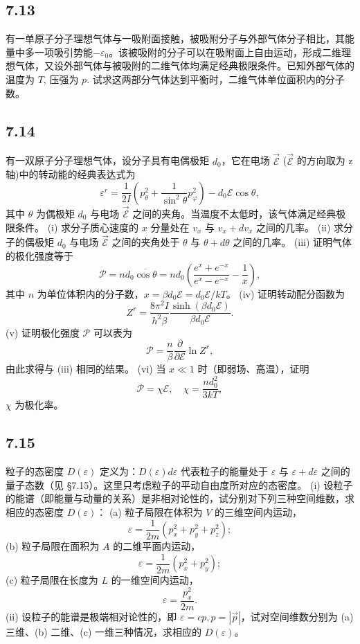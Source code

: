 \newpage
\subsection{7.13}
有一单原子分子理想气体与一吸附面接触，被吸附分子与外部气体分子相比，其能量中多一项吸引势能$-\varepsilon_0$。该被吸附的分子可以在吸附面上自由运动，形成二维理想气体，又设外部气体与被吸附的二维气体均满足经典极限条件。已知外部气体的温度为 $T$, 压强为 $p$. 试求这两部分气体达到平衡时，二维气体单位面积内的分子数。

\newpage
\subsection{7.14}
有一双原子分子理想气体，设分子具有电偶极矩 $d_0$，它在电场 $\vec{\mathcal{E}}$ ($\vec{\mathcal{E}}$ 的方向取为 z 轴)中的转动能的经典表达式为
$$\varepsilon^r = \frac{1}{2I} \left( p_{\theta}^2 + \frac{1}{\sin^2 \theta} p_{\varphi}^2 \right) - d_0 \mathcal{E} \cos \theta,$$
其中 $\theta$ 为偶极矩 $d_0$ 与电场 $\vec{\mathcal{E}}$ 之间的夹角。当温度不太低时，该气体满足经典极限条件。
(i) 求分子质心速度的 $x$ 分量处在 $v_x$ 与 $v_x + dv_x$ 之间的几率。
(ii) 求分子的偶极矩 $d_0$ 与电场 $\vec{\mathcal{E}}$ 之间的夹角处于 $\theta$ 与 $\theta + d\theta$ 之间的几率。
(iii) 证明气体的极化强度等于
$$\mathcal{P} = n d_0 \overline{\cos \theta} = n d_0 \left( \frac{e^x + e^{-x}}{e^x - e^{-x}} - \frac{1}{x} \right),$$
其中 $n$ 为单位体积内的分子数，$x = \beta d_0 \mathcal{E} = d_0 \mathcal{E} / kT$。
(iv) 证明转动配分函数为
$$Z^r = \frac{8 \pi^2 I}{h^2 \beta} \frac{\sinh(\beta d_0 \mathcal{E})}{\beta d_0 \mathcal{E}}.$$
(v) 证明极化强度 $\mathcal{P}$ 可以表为
$$\mathcal{P} = \frac{n}{\beta} \frac{\partial}{\partial \mathcal{E}} \ln Z^r,$$
由此求得与 (iii) 相同的结果。
(vi) 当 $x \ll 1$ 时（即弱场、高温），证明
$$\mathcal{P} = \chi \mathcal{E}, \quad \chi = \frac{n d_0^2}{3 k T},$$
$\chi$ 为极化率。

\newpage
\subsection{7.15}
粒子的态密度 $D(\varepsilon)$ 定义为：$D(\varepsilon) d\varepsilon$ 代表粒子的能量处于 $\varepsilon$ 与 $\varepsilon + d\varepsilon$ 之间的量子态数（见 §7.15）。这里只考虑粒子的平动自由度所对应的态密度。
(i) 设粒子的能谱（即能量与动量的关系）是非相对论性的，试分别对下列三种空间维数，求相应的态密度 $D(\varepsilon)$：
(a) 粒子局限在体积为 $V$ 的三维空间内运动，
$$\varepsilon = \frac{1}{2m} (p_x^2 + p_y^2 + p_z^2);$$
(b) 粒子局限在面积为 $A$ 的二维平面内运动，
$$\varepsilon = \frac{1}{2m} (p_x^2 + p_y^2);$$
(c) 粒子局限在长度为 $L$ 的一维空间内运动，
$$\varepsilon = \frac{p_x^2}{2m}.$$
(ii) 设粒子的能谱是极端相对论性的，即 $\varepsilon = cp, p = |\vec{p}|$，试对空间维数分别为 (a) 三维、(b) 二维、(c) 一维三种情况，求相应的 $D(\varepsilon)$。


